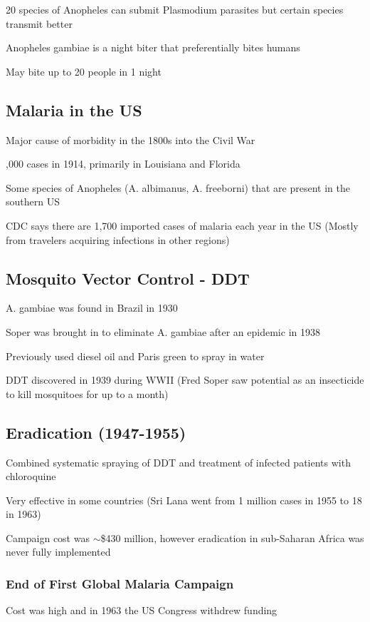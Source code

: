 \documentclass{notes}
\begin{document}
20 species of Anopheles can submit Plasmodium parasites but certain species transmit better

\tab \indicates Anopheles gambiae is a night biter that preferentially bites humans

\tab \indicates May bite up to 20 people in 1 night

\subsection*{Malaria in the US}
Major cause of morbidity in the 1800s into the Civil War

,000 cases in 1914, primarily in Louisiana and Florida

Some species of Anopheles (A. albimanus, A. freeborni) that are present in the southern US

CDC says there are 1,700 imported cases of malaria each year in the US (Mostly from travelers acquiring infections in other regions)

\subsection*{Mosquito Vector Control - DDT}
A. gambiae was found in Brazil in 1930

Soper was brought in to eliminate A. gambiae after an epidemic in 1938

\tab \indicates Previously used diesel oil and Paris green to spray in water

DDT discovered in 1939 during WWII (Fred Soper saw potential as an insecticide to kill mosquitoes for up to a month)

\subsection*{Eradication (1947-1955)}
Combined systematic spraying of DDT and treatment of infected patients with chloroquine

\tab \indicates Very effective in some countries (Sri Lana went from 1 million cases in 1955 to 18 in 1963)

Campaign cost was \(\sim\)\$430 million, however eradication in sub-Saharan Africa was never fully implemented

\subsubsection*{End of First Global Malaria Campaign}
Cost was high and in 1963 the US Congress withdrew funding
\end{document}
